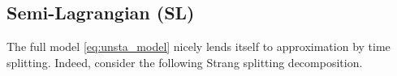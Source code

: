 \documentclass{article}
\numberwithin{equation}{section}
\newcommand{\todo}[1]{{\color{red}\textbf{#1}}}
\begin{document}
\subsection{Semi-Lagrangian (SL)}

The full model \cref{eq:unsta_model} nicely lends itself to approximation by time splitting. Indeed, consider the following Strang splitting decomposition. 


%
%
\end{document}
